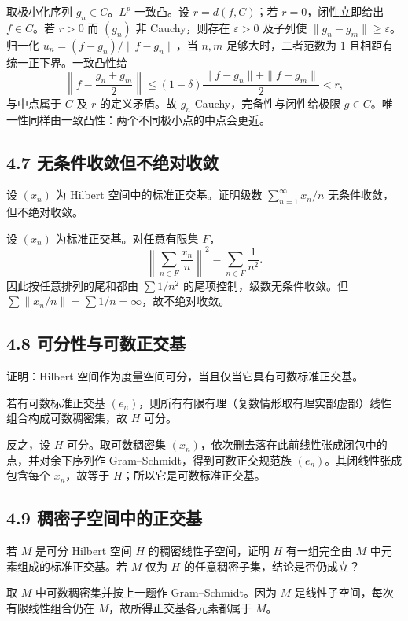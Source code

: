 取极小化序列 $g_n\in C$。$L^p$ 一致凸。设 $r=d(f,C)$；若 $r=0$，闭性立即给出 $f\in C$。若 $r>0$ 而 $(g_n)$ 非 Cauchy，则存在 $\varepsilon>0$ 及子列使 $\|g_n-g_m\|\ge\varepsilon$。归一化 $u_n=(f-g_n)/\|f-g_n\|$，当 $n,m$ 足够大时，二者范数为 $1$ 且相距有统一正下界。一致凸性给
\[
\left\|f-\frac{g_n+g_m}{2}\right\|
\le(1-\delta)\frac{\|f-g_n\|+\|f-g_m\|}{2}<r,
\]
与中点属于 $C$ 及 $r$ 的定义矛盾。故 $g_n$ Cauchy，完备性与闭性给极限 $g\in C$。唯一性同样由一致凸性：两个不同极小点的中点会更近。

\subsection*{4.7 无条件收敛但不绝对收敛}
\begin{problem}
设 $(x_n)$ 为 Hilbert 空间中的标准正交基。证明级数
$\sum_{n=1}^\infty x_n/n$ 无条件收敛，但不绝对收敛。
\end{problem}
设 $(x_n)$ 为标准正交基。对任意有限集 $F$，
\[
\left\|\sum_{n\in F}\frac{x_n}{n}\right\|^2=\sum_{n\in F}\frac1{n^2}.
\]
因此按任意排列的尾和都由 $\sum1/n^2$ 的尾项控制，级数无条件收敛。但
$\sum\|x_n/n\|=\sum1/n=\infty$，故不绝对收敛。

\subsection*{4.8 可分性与可数正交基}
\begin{problem}
证明：Hilbert 空间作为度量空间可分，当且仅当它具有可数标准正交基。
\end{problem}
若有可数标准正交基 $(e_n)$，则所有有限有理（复数情形取有理实部虚部）线性组合构成可数稠密集，故 $H$ 可分。

反之，设 $H$ 可分。取可数稠密集 $(x_n)$，依次删去落在此前线性张成闭包中的点，并对余下序列作 Gram--Schmidt，得到可数正交规范族 $(e_n)$。其闭线性张成包含每个 $x_n$，故等于 $H$；所以它是可数标准正交基。

\subsection*{4.9 稠密子空间中的正交基}
\begin{problem}
若 $M$ 是可分 Hilbert 空间 $H$ 的稠密线性子空间，证明 $H$ 有一组完全由 $M$ 中元素组成的标准正交基。若 $M$ 仅为 $H$ 的任意稠密子集，结论是否仍成立？
\end{problem}
取 $M$ 中可数稠密集并按上一题作 Gram--Schmidt。因为 $M$ 是线性子空间，每次有限线性组合仍在 $M$，故所得正交基各元素都属于 $M$。

